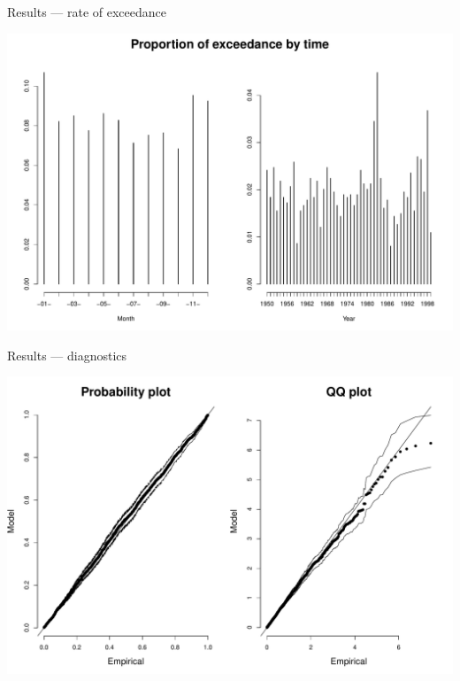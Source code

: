 \documentclass[mathserif, 11pt, t]{beamer}
\begin{document}
\begin{frame}{Results --- rate of exceedance}
\begin{center}
\includegraphics[scale=0.30]{../figs/exceedance_loc.pdf}
\end{center}
\end{frame}

\begin{frame}{Results --- diagnostics}
\begin{center}
\includegraphics[scale=0.30]{../figs/diag.pdf}
\end{center}
\end{frame}
\end{document}

